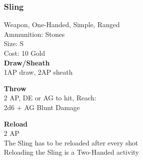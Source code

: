 \subsubsection{Sling}\label{weapon:sling}
Weapon, One-Handed, Simple, Ranged\\
Ammunition: Stones\\
Size: S\\
Cost: 10 Gold\\

\textbf{Draw/Sheath}\\
1AP draw, 2AP sheath

\textbf{Throw}\\
2 AP, DE or AG to hit,  Reach:\\
2d6 + \texttimes AG Blunt Damage

\textbf{Reload}\\
2 AP\\
The Sling has to be reloaded after every shot\\
Reloading the Sling is a Two-Handed activity
